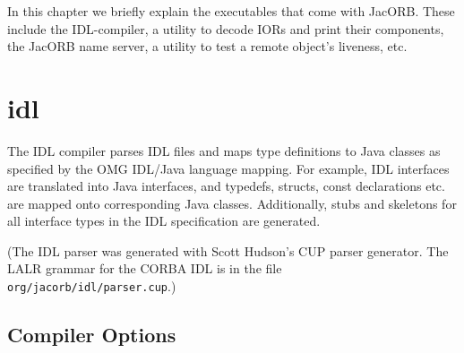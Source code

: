 %
%

In this chapter we  briefly explain the executables that come
with JacORB. These include the IDL-compiler, a utility to decode IORs
and print their components, the JacORB name server, a utility to test
a remote object's liveness, etc.

\section{idl}

The IDL compiler parses IDL files and maps type definitions to Java
classes as specified by the OMG IDL/Java language mapping. For
example, IDL interfaces are translated into Java interfaces, and
typedefs, structs, const declarations etc.  are mapped onto
corresponding Java classes. Additionally, stubs and skeletons for all
interface types in the IDL specification are generated.

(The  IDL  parser  was   generated  with  Scott  Hudson's  CUP  parser
generator.  The  LALR grammar for  the CORBA IDL  is in the  file {\tt
org/jacorb/idl/parser.cup}.)

\subsection*{Compiler Options}

